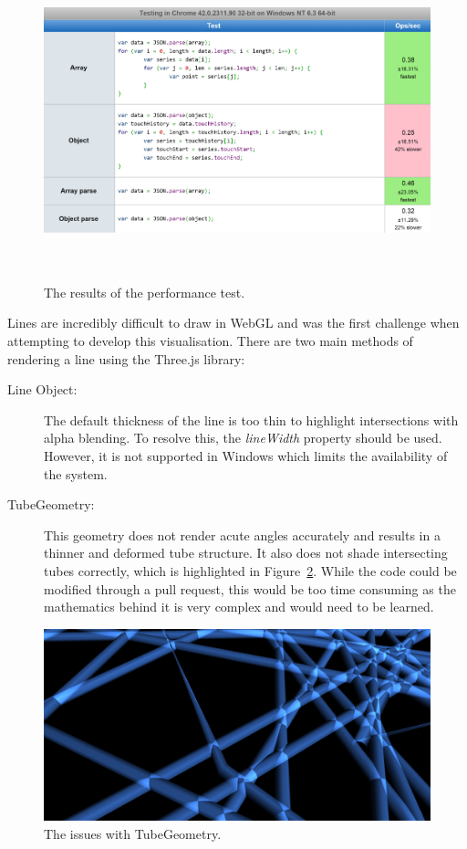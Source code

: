 \documentclass[a4paper]{article}
\begin{document}
\begin{appendices}
{			\begin{figure}[H]
        		\href{http://jsperf.com/object-and-array-reading}{\includegraphics[width=\textwidth,height=8.5cm]{images/performance-test}}
				\caption{The results of the performance test.}
				\label{fig:performance_test}
			\end{figure}
			
			Lines are incredibly difficult to draw in WebGL \citep{deslauriers2015lines} and was the first challenge when attempting to develop this visualisation. There are two main methods of rendering a line using the Three.js library: 
			
			\begin{description}
				\item[Line Object:] The default thickness of the line is too thin to highlight intersections with alpha blending. To resolve this, the \emph{lineWidth} property should be used. However, it is not supported in Windows which limits the availability of the system.
				\item[TubeGeometry:] This geometry does not render acute angles accurately and results in a thinner and deformed tube structure. It also does not shade intersecting tubes correctly, which is highlighted in Figure~\ref{fig:tube_geometry}. While the code could be modified through a pull request, this would be too time consuming as the mathematics behind it is very complex and would need to be learned.
			\end{description}
			
			\begin{figure}[H]
        		\includegraphics[width=\textwidth]{images/tube-geometry}
				\caption{The issues with TubeGeometry.}
				\label{fig:tube_geometry}
			\end{figure}
			
}
\end{appendices}
\end{document}
